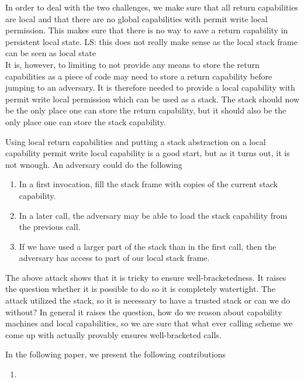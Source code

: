 \documentclass[compsoc,conference,letterpaper,fleqn]{IEEEtran}
\newcommand\lau[1]{{\color{purple} \sf \footnotesize {LS: #1}}\\}
\begin{document}
In order to deal with the two challenges, we make sure that all return
capabilities are local and that there are no global capabilities with
permit write local permission. This makes sure that there is no way to
save a return capability in persistent local state.\lau{this does not really make
sense as the local stack frame can be seen as local state} It is,
however, to limiting to not provide any means to store the return
capabilities as a piece of code may need to store a return capability
before jumping to an adversary. It is therefore needed to provide a
local capability with permit write local permission which can be used
as a stack. The stack should now be the only place one can store the
return capability, but it should also be the only place one can store
the stack capability. 

Using local return capabilities and putting a stack abstraction on a
local capability permit write local capability is a good start, but as
it turns out, it is not wnough. An adversary could do the following 
\begin{enumerate}
\item In a first invocation, fill the stack frame with copies of the
  current stack capability.
\item In a later call, the adversary may be able to load the stack
  capability from the previous call.
\item If we have used a larger part of the stack than in the first
  call, then the adversary has access to part of our local stack frame.
\end{enumerate}

The above attack shows that it is tricky to ensure
well-bracketedness. It raises the question whether it is possible to
do so it is completely watertight. The attack utilized the stack, so
it is necessary to have a trusted stack or can we do without? In
general it raises the question, how do we reason about capability
machines and local capabilities, so we are sure that what ever calling
scheme we come up with actually provably ensures well-bracketed calls.

In the following paper, we present the following contributions
\begin{enumerate}
\item 
\end{enumerate}
 







\end{document}
